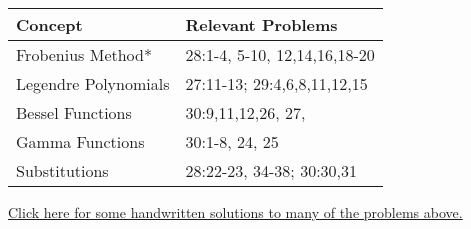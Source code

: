 \begin{center}
\begin{tabular}{|l|l|}
\hline
Concept	&Relevant Problems\\\hline
Frobenius Method*&28:1-4, 5-10, 12,14,16,18-20\\ \hline
Legendre Polynomials&27:11-13; 29:4,6,8,11,12,15 \\ \hline
Bessel Functions&30:9,11,12,26, 27,\\ \hline
Gamma Functions& 30:1-8, 24, 25\\ \hline
Substitutions&28:22-23, 34-38; 30:30,31 \\ \hline
\end{tabular}
\end{center}

\href{https://content.byui.edu/file/664390b8-e9cc-43a4-9f3c-70362f8b9735/1/09-Special-Functions-Preparation-Solutions.pdf}{Click here for some handwritten solutions to many of the problems above. }

\restoregeometry




